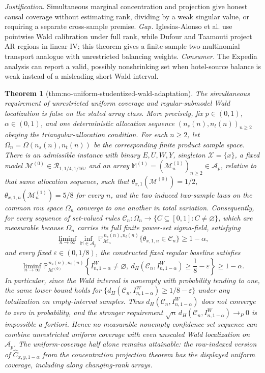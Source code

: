 \documentclass{article}
\newtheorem{theorem}{Theorem}
\begin{document}
\par\smallskip\noindent \textit{Justification.} Simultaneous marginal concentration and projection give honest causal coverage without estimating rank, dividing by a weak singular value, or requiring a separate cross-sample premise. \textit{Gap.} Iglesias-Alonso et al. use pointwise Wald calibration under full rank, while Dufour and Taamouti project AR regions in linear IV; this theorem gives a finite-sample two-multinomial transport analogue with unrestricted balancing weights. \textit{Consumer.} The Expedia analysis can report a valid, possibly nonshrinking set when hotel-source balance is weak instead of a misleading short Wald interval.

\begin{theorem}[thm:no-uniform-studentized-wald-adaptation]\label{thm:no-uniform-studentized-wald-adaptation}
The simultaneous requirement of unrestricted uniform coverage and regular-submodel Wald localization is false on the stated array class. More precisely, fix \(p\in(0,1)\), \(\alpha\in(0,1)\), and one deterministic allocation sequence \((n_s(n),n_t(n))_{n\ge2}\) obeying the triangular-allocation condition. For each \(n\ge2\), let \(\Omega_n=\Omega(n_s(n),n_t(n))\) be the corresponding finite product sample space. There is an admissible instance with binary \(E,U,W,Y\), singleton \(\mathcal X=\{x\}\), a fixed model \(\mathcal M^{(0)}\in\mathcal R_{1,1/4,1/16}\), and an array \(\mathbb M^{(1)}=(\mathcal M^{(1)}_n)_{n\ge2}\in\mathcal A_p\), relative to that same allocation sequence, such that \(\theta_{x,1}(\mathcal M^{(0)})=1/2\), \(\theta_{x,1,n}(\mathcal M^{(1)}_n)=5/8\) for every \(n\), and the two induced two-sample laws on the common row space \(\Omega_n\) converge to one another in total variation. Consequently, for every sequence of set-valued rules \(\mathcal C_n:\Omega_n\to\{C\subseteq[0,1]:C\ne\varnothing\}\), which are measurable because \(\Omega_n\) carries its full finite power-set sigma-field, satisfying
\[
\liminf_{n\to\infty}\inf_{\mathbb M\in\mathcal A_p}
\mathbb P_{\mathcal M_n}^{\,n_s(n),n_t(n)}
\{\theta_{x,1,n}\in\mathcal C_n\}
\ge 1-\alpha,
\]
and every fixed \(\varepsilon\in(0,1/8)\), the constructed fixed regular baseline satisfies
\[
\liminf_{n\to\infty}
\mathbb P_{\mathcal M^{(0)}}^{\,n_s(n),n_t(n)}
\left\{I^W_{n,1-\alpha}\ne\varnothing,\ 
d_H\!\left(\mathcal C_n,I^W_{n,1-\alpha}\right)
\ge\frac18-\varepsilon\right\}
\ge1-\alpha.
\]
In particular, since the Wald interval is nonempty with probability tending to one, the same lower bound holds for \(\{d_H(\mathcal C_n,I^W_{n,1-\alpha})\ge1/8-\varepsilon\}\) under any totalization on empty-interval samples. Thus \(d_H(\mathcal C_n,I^W_{n,1-\alpha})\) does not converge to zero in probability, and the stronger requirement \(\sqrt n\,d_H(\mathcal C_n,I^W_{n,1-\alpha})\longrightarrow_P0\) is impossible a fortiori. Hence no measurable nonempty confidence-set sequence can combine unrestricted uniform coverage with even unscaled Wald localization on \(\mathcal A_p\). The uniform-coverage half alone remains attainable: the row-indexed version of \(\widehat C_{x,y,1-\alpha}\) from the concentration projection theorem has the displayed uniform coverage, including along changing-rank arrays.
\end{theorem}
\end{document}
